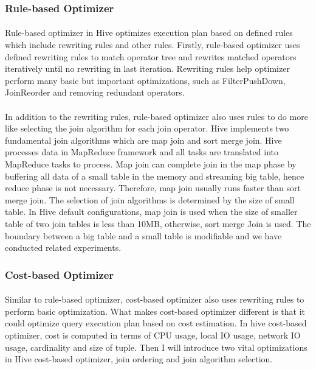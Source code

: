         \subsubsection{Rule-based Optimizer}
        \label{section:rbo}
            \paragraph{}
            Rule-based optimizer in Hive optimizes execution plan based on defined rules which include rewriting rules and other rules. 
            Firstly, rule-based optimizer uses defined rewriting rules to match operator tree and rewrites matched operators iteratively 
            until no rewriting in last iteration. Rewriting rules help optimizer perform many basic but important optimizations, such
            as FilterPushDown, JoinReorder and removing redundant operators. 
            \paragraph{}
            In addition to the rewriting rules, rule-based optimizer also uses rules to do more like selecting the join algorithm 
            for each join operator. Hive implements two fundamental join algorithms which are map join and sort merge join. Hive processes
            data in MapReduce\cite{MapReduce} framework and all tasks are translated into MapReduce tasks to process. Map join can complete join
            in the map phase by buffering all data of a small table in the memory and streaming big table, hence reduce phase is not necessary.
            Therefore, map join usually runs faster than sort merge join. The selection of join algorithms is determined by the size of small table. In Hive
            default configurations, map join is used when the size of smaller table of two join tables is less than 10MB, otherwise, sort merge Join is used.             
            The boundary between a big table and a small table is modifiable and we have conducted related experiments.    
        
        \subsubsection{Cost-based Optimizer} 
        \label{section:cbo}
            \paragraph{}
            Similar to rule-based optimizer, cost-based optimizer also uses rewriting rules to perform basic optimization. What makes cost-based 
            optimizer different is that it could optimize query execution plan based on cost estimation. In hive cost-based optimizer, cost is computed 
            in terms of CPU usage, local IO usage, network IO usage, cardinality and size of tuple. Then I will introduce two vital optimizations in 
            Hive cost-based optimizer, join ordering and join algorithm selection. 
